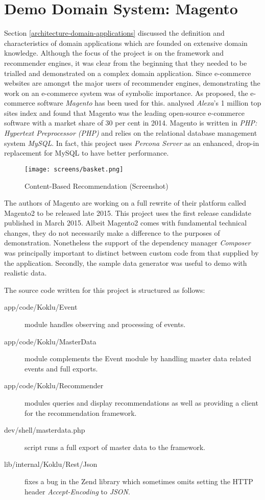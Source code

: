 \section{Demo Domain System: Magento}

Section \ref{architecture-domain-applications} discussed the definition and characteristics of domain applications which are founded on extensive domain knowledge. Although the focus of the project is on the framework and recommender engines, it was clear from the beginning that they needed to be trialled and demonstrated on a complex domain application. Since e-commerce websites are amongst the major users of recommender engines, demonstrating the work on an e-commerce system was of symbolic importance. As proposed, the e-commerce software \emph{Magento} has been used for this. \citet{aheadworks14} analysed \emph{Alexa}'s 1 million top sites index and found that Magento was the leading open-source e-commerce software with a market share of 30 per cent in 2014. Magento is written in \emph{PHP: Hypertext Preprocessor (PHP)} and relies on the relational database management system \emph{MySQL}. In fact, this project uses \emph{Percona Server} as an enhanced, drop-in replacement for MySQL to have better performance.

\begin{figure}[!ht]
    \texttt{[image: screens/basket.png]}
    \caption{Content-Based Recommendation (Screenshot)}
    \label{fig:implementation-magento-basket}
\end{figure}

The authors of Magento are working on a full rewrite of their platform called Magento2 to be released late 2015. This project uses the first release candidate published in March 2015. Albeit Magento2 comes with fundamental technical changes, they do not necessarily make a difference to the purposes of demonstration. Nonetheless the support of the dependency manager \emph{Composer} was principally important to distinct between custom code from that supplied by the application. Secondly, the sample data generator was useful to demo with realistic data.

The source code written for this project is structured as follows:

\begin{description}
    \item[app/code/Koklu/Event] module handles observing and processing of events.
    \item[app/code/Koklu/MasterData] module complements the Event module by handling master data related events and full exports.
    \item[app/code/Koklu/Recommender] modules queries and display recommendations as well as providing a client for the recommendation framework.
    \item[dev/shell/masterdata.php] script runs a full export of master data to the framework.
    \item[lib/internal/Koklu/Rest/Json] fixes a bug in the Zend library which sometimes omits setting the HTTP header \emph{Accept-Encoding} to \emph{JSON}.
\end{description}

